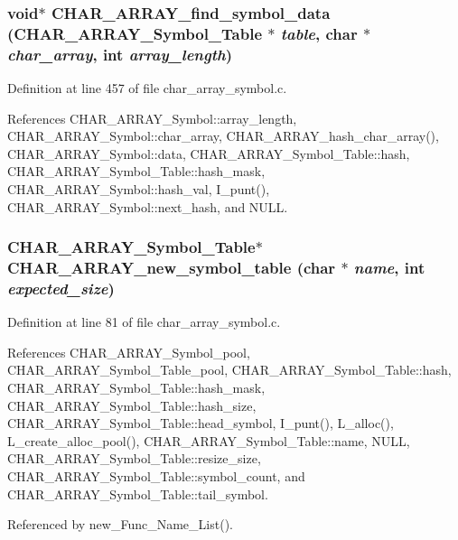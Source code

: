 \subsubsection{\setlength{\rightskip}{0pt plus 5cm}void$\ast$ CHAR\_\-ARRAY\_\-find\_\-symbol\_\-data (\bf{CHAR\_\-ARRAY\_\-Symbol\_\-Table} $\ast$ {\em table}, char $\ast$ {\em char\_\-array}, int {\em array\_\-length})}\label{char__array__symbol_8h_b546ec2032db6c4b254c1ab5c507d294}




Definition at line 457 of file char\_\-array\_\-symbol.c.

References CHAR\_\-ARRAY\_\-Symbol::array\_\-length, CHAR\_\-ARRAY\_\-Symbol::char\_\-array, CHAR\_\-ARRAY\_\-hash\_\-char\_\-array(), CHAR\_\-ARRAY\_\-Symbol::data, CHAR\_\-ARRAY\_\-Symbol\_\-Table::hash, CHAR\_\-ARRAY\_\-Symbol\_\-Table::hash\_\-mask, CHAR\_\-ARRAY\_\-Symbol::hash\_\-val, I\_\-punt(), CHAR\_\-ARRAY\_\-Symbol::next\_\-hash, and NULL.
\subsubsection{\setlength{\rightskip}{0pt plus 5cm}\bf{CHAR\_\-ARRAY\_\-Symbol\_\-Table}$\ast$ CHAR\_\-ARRAY\_\-new\_\-symbol\_\-table (char $\ast$ {\em name}, int {\em expected\_\-size})}\label{char__array__symbol_8h_092b50cb132d4edfa42c9fdbd1496444}




Definition at line 81 of file char\_\-array\_\-symbol.c.

References CHAR\_\-ARRAY\_\-Symbol\_\-pool, CHAR\_\-ARRAY\_\-Symbol\_\-Table\_\-pool, CHAR\_\-ARRAY\_\-Symbol\_\-Table::hash, CHAR\_\-ARRAY\_\-Symbol\_\-Table::hash\_\-mask, CHAR\_\-ARRAY\_\-Symbol\_\-Table::hash\_\-size, CHAR\_\-ARRAY\_\-Symbol\_\-Table::head\_\-symbol, I\_\-punt(), L\_\-alloc(), L\_\-create\_\-alloc\_\-pool(), CHAR\_\-ARRAY\_\-Symbol\_\-Table::name, NULL, CHAR\_\-ARRAY\_\-Symbol\_\-Table::resize\_\-size, CHAR\_\-ARRAY\_\-Symbol\_\-Table::symbol\_\-count, and CHAR\_\-ARRAY\_\-Symbol\_\-Table::tail\_\-symbol.

Referenced by new\_\-Func\_\-Name\_\-List().
